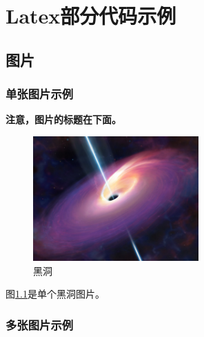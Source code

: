 \chapter{Latex部分代码示例}\thispagestyle{main}

\section{图片}

\subsection{单张图片示例}

\par \textbf{注意，图片的标题在下面。}

\begin{figure}[!ht]
    \centering
    \includegraphics[width=2.5in]{images/blackhole.jpeg}
    \caption{黑洞}
    \label{fig:blackhole1}
\end{figure}
图\ref{fig:blackhole1}是单个黑洞图片。

\subsection{多张图片示例}

